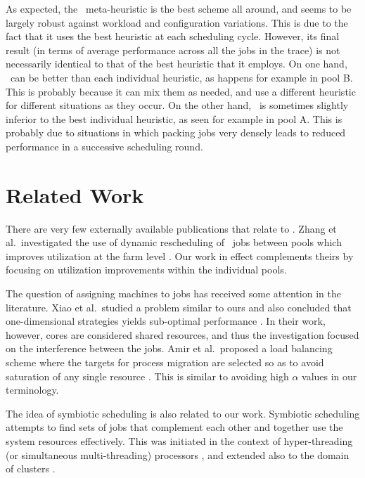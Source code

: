 As expected, the \maj\ meta-heuristic is the
best scheme all around, and seems to be largely robust against workload and configuration variations.
This is due to the fact that it uses the best heuristic at each
scheduling cycle.
However, its final result (in terms of average performance across all
the jobs in the trace) is not necessarily identical to that of the
best heuristic that it employs.
On one hand, \maj\ can be better than each individual heuristic, as
happens for example in pool B.
This is probably because it can mix them as needed, and use a
different heuristic for different situations as they occur.
On the other hand, \maj\ is sometimes slightly inferior to the best
individual heuristic, as seen for example in pool A.
This is probably due to situations in which packing jobs very densely
leads to reduced performance in a successive scheduling round.


\chapter{Related Work}
\label{sec:related}

There are very few externally available publications that relate to \nb.
Zhang et al.\ investigated the use of dynamic rescheduling of
\nb\ jobs between pools which improves utilization at the farm level
\cite{Zhang2010}.
Our work in effect complements theirs by focusing on utilization
improvements within the individual pools.

The question of assigning machines to jobs has received some attention
in the literature.
Xiao et al.\ studied a problem similar to ours and also concluded that
one-dimensional strategies yields sub-optimal performance
\cite{Xiao02dynamiccluster}.
In their work, however, cores are considered shared resources, and
thus the investigation focused on the interference between the jobs.
Amir et al.\ proposed a load balancing scheme where the targets for
process migration are selected so as to avoid saturation of any single
resource \cite{amir00}.
This is similar to avoiding high $\alpha$ values in our terminology.

The idea of symbiotic scheduling is also related to our work.
Symbiotic scheduling attempts to find sets of jobs that complement
each other and together use the system resources effectively.
This was initiated in the context of hyper-threading (or simultaneous
multi-threading) processors \cite{snavely00,eyerman10},
and extended also to the domain of clusters \cite{weinberg06}.

